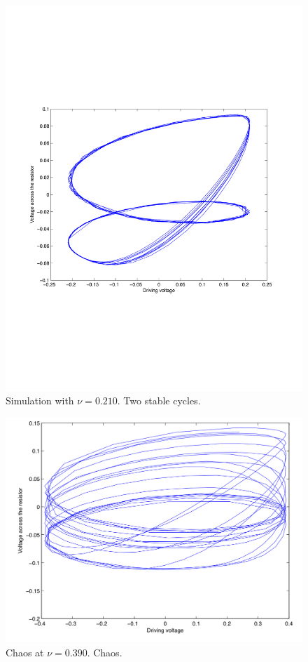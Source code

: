\documentclass[12pt]{report}
\begin{document}
	\begin{figure}
		\centering
		\includegraphics{simulations/plot0210.pdf}
		\caption{Simulation with $\nu=0.210$. Two stable cycles.}
		\label{fig:sim.0210}
	\end{figure}

	\begin{figure}
		\centering
		\includegraphics{simulations/plotnu0390.png}
		\caption{Chaos at $\nu=0.390$. Chaos.}
		\label{fig:sim.0390}
	\end{figure}
\end{document}
